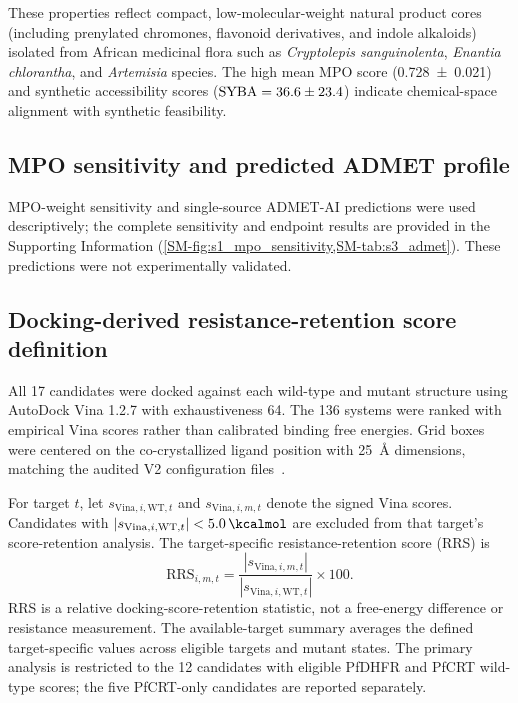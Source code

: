 \documentclass[11pt,a4paper]{article}
\begin{document}
These properties reflect compact, low-molecular-weight natural product cores (including prenylated chromones, flavonoid derivatives, and indole alkaloids) isolated from African medicinal flora such as \textit{Cryptolepis sanguinolenta}, \textit{Enantia chlorantha}, and \textit{Artemisia} species. The high mean MPO score (\num{0.728 \pm 0.021}) and synthetic accessibility scores ($\mathrm{SYBA} = \num{36.6 \pm 23.4}$) indicate chemical-space alignment with synthetic feasibility.

\subsection{MPO sensitivity and predicted ADMET profile}

MPO-weight sensitivity and single-source ADMET-AI predictions were used descriptively; the complete sensitivity and endpoint results are provided in the Supporting Information (\cref{SM-fig:s1_mpo_sensitivity,SM-tab:s3_admet}). These predictions were not experimentally validated.

\subsection{Docking-derived resistance-retention score definition}\label{sec:rrs_formula}

All 17 candidates were docked against each wild-type and mutant structure using AutoDock Vina 1.2.7 with exhaustiveness \num{64}. The 136 systems were ranked with empirical Vina scores rather than calibrated binding free energies. Grid boxes were centered on the co-crystallized ligand position with \qty{25}{\angstrom} dimensions, matching the audited V2 configuration files~\citep{Temgoua2026}.

For target $t$, let $s_{\mathrm{Vina},i,\mathrm{WT},t}$ and $s_{\mathrm{Vina},i,m,t}$ denote the signed Vina scores. Candidates with $|s_{\mathrm{Vina},i,\mathrm{WT},t}| < \qty{5.0}{\kcalmol}$ are excluded from that target's score-retention analysis. The target-specific resistance-retention score (RRS) is
\begin{equation}
\mathrm{RRS}_{i,m,t} = \frac{|s_{\mathrm{Vina},i,m,t}|}{|s_{\mathrm{Vina},i,\mathrm{WT},t}|} \times 100.
\end{equation}
RRS is a relative docking-score-retention statistic, not a free-energy difference or resistance measurement. The available-target summary averages the defined target-specific values across eligible targets and mutant states. The primary analysis is restricted to the 12 candidates with eligible PfDHFR and PfCRT wild-type scores; the five PfCRT-only candidates are reported separately.
\end{document}
